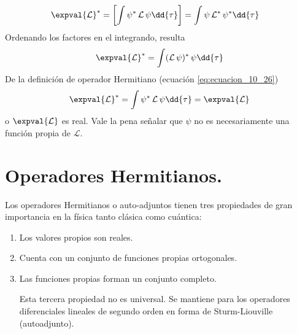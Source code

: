 \begin{align*}
\expval{\mathcal{L}}^{*} &= \left[ \int \psi^{*} \, \mathcal{L} \, \psi \dd{\tau} \right] = \int \psi \, \mathcal{L}^{*} \, \psi^{*} \dd{\tau}
\end{align*}
Ordenando los factores en el integrando, resulta
\begin{align*}
\expval{\mathcal{L}}^{*} = \int (\mathcal{L} \, \psi)^{*} \, \psi \dd{\tau}
\end{align*}
De la definición de operador Hermitiano (ecuación \ref{eq:ecuacion_10_26})
\begin{equation}
\expval{\mathcal{L}}^{*} = \int \psi^{*} \, \mathcal{L} \, \psi \dd{\tau} = \expval{\mathcal{L}} 
\label{eq:ecuacion_10_28b}
\end{equation}
o $\expval{\mathcal{L}}$ es real. Vale la pena señalar que $\psi$ no es necesariamente una función propia de $\mathcal{L}$.
\section{Operadores Hermitianos.}
Los operadores Hermitianos o auto-adjuntos tienen tres propiedades de gran importancia en la física tanto clásica como cuántica:
\begin{enumerate}
\item Los valores propios son reales.
\item Cuenta con un conjunto de funciones propias ortogonales.
\item Las funciones propias forman un conjunto completo.
\par
Esta tercera propiedad no es universal. Se mantiene para los operadores diferenciales lineales de segundo orden en forma de Sturm-Liouville (autoadjunto).
\end{enumerate}
